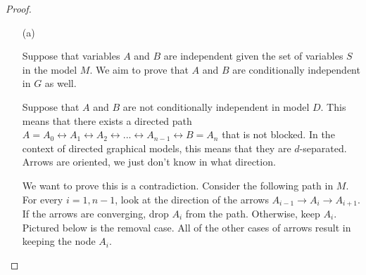 \documentclass{article}
\begin{document}
\begin{proof}

\begin{enumerate}

\item[(a)]

Suppose that variables $A$ and $B$ are independent given the set of variables $S$ in the model $M$. We aim to prove that $A$ and $B$ are conditionally independent in $G$ as well.

Suppose that $A$ and $B$ are not conditionally independent in model $D$. This means that there exists a directed path $A = A_0 \leftrightarrow A_1 \leftrightarrow A_2 \leftrightarrow ... \leftrightarrow A_{n-1} \leftrightarrow B = A_n$ that is not blocked. In the context of directed graphical models, this means that they are $d$-separated. Arrows are oriented, we just don't know in what direction. 

\begin{center}
\end{center}


We want to prove this is a contradiction. Consider the following path in $M$. For every $i =1,n-1$, look at the direction of the arrows $A_{i-1} \to A_{i} \to A_{i+1}$. If the arrows are converging, drop $A_i$ from the path. Otherwise, keep $A_i$. Pictured below is the removal case. All of the other cases of arrows result in keeping the node $A_i$.

\begin{center}
\end{center}




\end{enumerate}
\end{proof}
\end{document}
